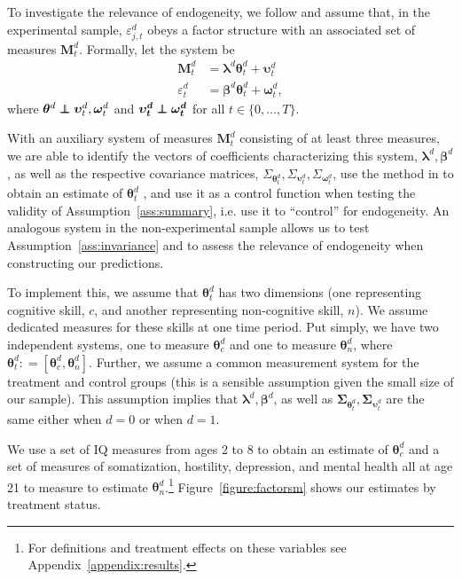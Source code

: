 To investigate the relevance of endogeneity, we follow \citet{Heckman_Pinto_etal_2013_PerryFactor} and assume that, in the experimental sample, $\varepsilon_{j,t}^d$ obeys a factor structure with an associated set of measures $\bm{M}_{t}^d$. Formally, let the system be
\begin{align}\label{eq:sa-msystemmain}
\bm{M}_{t}^d &= \bm{\lambda}^d \bm{\theta}_{t}^d +  \bm{\upsilon}_t^d   \nonumber \\
\varepsilon_{t}^d &=\bm{\beta}^d \bm{\theta}_{t}^d + \bm{\omega}_{t}^d,
\end{align}
where $\bm{\theta}^d  \independent \bm{\upsilon}_{t}^d,  \bm{\omega}_{t}^d$ and $\bm{\upsilon_{t}^d} \independent \bm{\omega_{t}^d}$ for all $t \in \{0, \ldots, T \}$.

With an auxiliary system of measures $\bm{M}_{t}^d $ consisting of at least three measures, we are able to identify the vectors of coefficients characterizing this system, $\bm{\lambda}^d, \bm{\beta}^d$, as well as the respective covariance matrices, $\Sigma_{\bm{\theta}_{t}^d}, \Sigma_{\bm{\upsilon}_{t}^d}, \Sigma_{\bm{\omega}_{t}^d}$, use the method in \citet{Bartlett_1938_Nature} to obtain an estimate of $\bm{\theta}_{t}^d$ \citep{Cunha_Heckman_ea_2005_oep,Cunha_Heckman_etal_2010_est_tech_cognoncog}, and use it as a control function when testing the validity of Assumption~\ref{ass:summary}, i.e. use it to ``control'' for endogeneity. An analogous system in the non-experimental sample allows us to test Assumption~\ref{ass:invariance} and to assess the relevance of endogeneity when constructing our predictions.

To implement this, we assume that $\bm{\theta}_{t}^d$ has two dimensions (one representing cognitive skill, $c$, and another representing non-cognitive skill, $n$). We assume dedicated measures for these skills at one time period. Put simply, we have two independent systems, one to measure $\bm{\theta}_{c}^d$ and one to measure $\bm{\theta}_{n}^d$, where $\bm{\theta}_{t}^d: = \left[ \bm{\theta}_{c}^d, \bm{\theta}_{n}^d \right]$. Further, we assume a common measurement system for the treatment and control groups (this is a sensible assumption given the small size of our sample). This assumption implies that $\bm{\lambda}^d, \bm{\beta}^d$, as well as $\bm{\Sigma}_{\bm{\theta}_{t}^d}, \bm{\Sigma}_{\bm{\upsilon}_{t}^d}$ are the same either when $d = 0$ or when $d = 1$.

We use a set of IQ measures from ages 2 to 8 to obtain an estimate of $\bm{\theta}_{c}^d$ and a set of measures of somatization, hostility, depression, and mental health all at age 21 to measure to estimate $\bm{\theta}_{n}^d$.\footnote{For definitions and treatment effects on these variables see Appendix~\ref{appendix:results}.} Figure~\ref{figure:factorsm} shows our estimates by treatment status.

